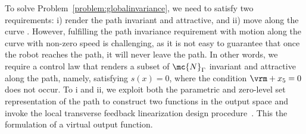 To solve Problem~\ref{problem:globalinvariance}, we need to satisfy two requirements: i) render the path invariant and  attractive, and ii) move along the curve . 
However, fulfilling the path invariance requirement with motion along the curve with non-zero speed is challenging, as it is not easy to guarantee that once the robot reaches the path, it will never leave the path. In other words, we require a control law that renders a subset of $\mc{N}_\Gamma$
invariant and  attractive along the path, namely, satisfying $s(x) = 0$, where the condition $\vrm + x_5 = 0$ does not occur. To  i and ii, we exploit both the parametric and zero-level set representation of the path to construct two functions in the output space and invoke the local transverse feedback linearization design procedure~\cite{NieFulMag10,AkhNieWas2015}. This  the formulation of a virtual output function.

